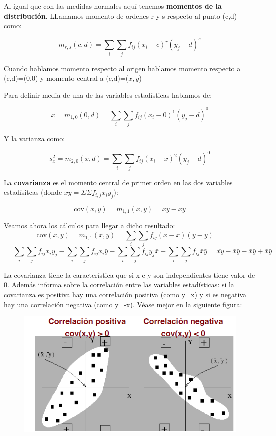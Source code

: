 \documentclass[12pt,a4paper]{book}
\newcommand{\cov}{\mathrm{cov}}
\begin{document}
Al igual que con las medidas normales aquí tenemos \textbf{momentos de la distribución}. LLamamos momento de ordenes r y s respecto al punto (c,d) como:

\begin{equation}
m_{r,s} (c,d)  = \sum_i \sum_j f_ {ij} (x_i-c)^r(y_j-d)^s
\end{equation}

Cuando hablamos momento respecto al origen hablamos momento respecto a (c,d)=(0,0) y momento central a (c,d)=($\bar{x}, \bar{y}$)

Para definir media de una de las variables estadísticas hablamos de:

\begin{equation}
\bar{x} = m_{1,0}(0,d) = \sum_i \sum_j f_{ij} (x_i-0)^1(y_j-d)^0
\end{equation}

Y la varianza como:

\begin{equation}
s_x^2=m_{2,0} (\bar{x},d) = \sum_i \sum_j f_{ij} (x_i-\bar{x})^2(y_j-d)^0 
\end{equation}

La \textbf{covarianza} es el momento central de primer orden en las dos variables estadísitcas (donde $\overline{xy}=\Sigma \Sigma f_{i,j} x_i y_j$):

\begin{equation}
\cov(x,y) = m_{1,1} (\bar{x}, \bar{y}) = \overline{xy} - \bar{x}\bar{y}
\end{equation}

Veamos ahora los cálculos para llegar a dicho resultado:
$$  \cov(x,y) = m_{1,1} (\bar{x}, \bar{y}) = \sum_i \sum_j f_{ij}(x-\bar{x})(y-\bar{y}) =  $$  $$ = \sum_i \sum_ j f_{ij} x_i y_j - \sum_i \sum_ j f_{ij} x_i \bar{y} - \sum_i \sum_ j f_{ij} y_j \bar{x} + \sum_i \sum_ j f_{ij} \bar{x} \bar{y}  = \overline{x y } - \bar{x}\bar{y} - \bar{x}\bar{y} + \bar{x}\bar{y}  $$


La covarianza tiene la característica que si x e y son independientes tiene valor de 0. Además informa sobre la correlación entre las variables estadísticas: si la covarianza es positiva hay una correlación positiva (como y=x) y si es negativa hay una correlación 
negativa (como y=-x). Véase mejor en la siguiente figura:  

\begin{figure}[h!] \centering
\includegraphics[scale=0.8]{covarianza.png}
\end{figure}
\end{document}

